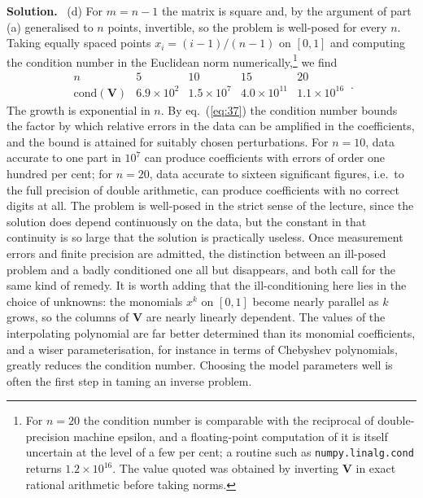 \documentclass[a4paper,12pt]{paper}
\newenvironment{solution}{\par\noindent\textbf{Solution.}\ }{\par\medskip}
\begin{document}
\begin{solution}
(d) For $m=n-1$ the matrix is square and, by the argument of part (a) generalised to $n$
points, invertible, so the problem is well-posed for every $n$. Taking equally spaced
points $x_{i}=(i-1)/(n-1)$ on $[0,1]$ and computing the condition number in the Euclidean
norm numerically,\footnote{For $n=20$ the condition number is comparable with the
reciprocal of double-precision machine epsilon, and a floating-point computation of it
is itself uncertain at the level of a few per cent; a routine such as
\texttt{numpy.linalg.cond} returns $1.2\times10^{16}$. The value quoted was obtained by
inverting $\mathbf{V}$ in exact rational arithmetic before taking norms.} we find
\begin{equation}
\begin{array}{c|cccc}
n & 5 & 10 & 15 & 20\\ \hline
\mathrm{cond}(\mathbf{V}) & 6.9\times10^{2} & 1.5\times10^{7} & 4.0\times10^{11} & 1.1\times10^{16}
\end{array}\,.
\label{eq:43}
\end{equation}
The growth is exponential in $n$. By eq.~(\ref{eq:37}) the condition number bounds the
factor by which relative errors in the data can be amplified in the coefficients, and the
bound is attained for suitably chosen perturbations. For $n=10$, data accurate to one part
in $10^{7}$ can produce coefficients with errors of order one hundred per cent; for $n=20$,
data accurate to sixteen significant figures, i.e.\ to the full precision of double
arithmetic, can produce coefficients with no correct digits at all. The problem is
well-posed in the strict sense of the lecture, since the solution does depend continuously
on the data, but the constant in that continuity is so large that the solution is
practically useless. Once measurement errors and finite precision are admitted, the
distinction between an ill-posed problem and a badly conditioned one all but disappears,
and both call for the same kind of remedy. It is worth adding that the ill-conditioning
here lies in the choice of unknowns: the monomials $x^{k}$ on $[0,1]$ become nearly
parallel as $k$ grows, so the columns of $\mathbf{V}$ are nearly linearly dependent. The
values of the interpolating polynomial are far better determined than its monomial
coefficients, and a wiser parameterisation, for instance in terms of Chebyshev
polynomials, greatly reduces the condition number. Choosing the model parameters well is
often the first step in taming an inverse problem.
\end{solution}
\end{document}
